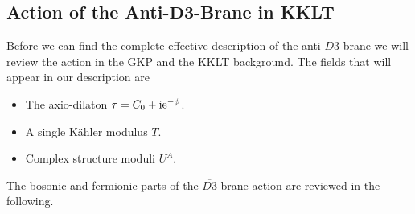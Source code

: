 \documentclass[a4paper,12pt,twoside,openright]{report}
\def\rmi{{\rm i}}
\def\rme{{\rm e}}
\begin{document}
\subsection[Action of the Anti-$D3$-Brane in KKLT]{Action of the Anti-$\mathbf{D3}$-Brane in KKLT}
\label{sec:D3barKKLT}
Before we can find the complete effective description of the anti-$D3$-brane we will review the action in the GKP \cite{Giddings:2001yu} and the KKLT \cite{Kachru:2003aw,Kachru:2003sx} background. The fields that will appear in our description are 
\begin{itemize}
\item The axio-dilaton $\tau = C_0 + \rmi \rme^{-\phi}$.
\item A single Kähler modulus $T$.
\item Complex structure moduli $U^A$.
\end{itemize}
The bosonic and fermionic parts of the $\overline{D3}$-brane action are reviewed in the following.
\end{document}
